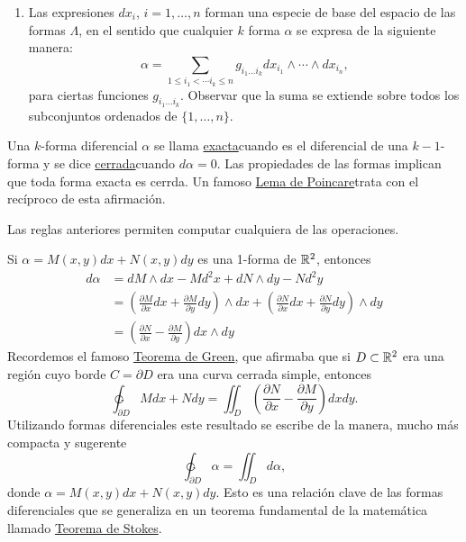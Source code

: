 \begin{subappendices}
\begin{enumerate}
\begin{enumerate}
  \end{enumerate}
  \item Las expresiones $dx_i$, $i=1,\ldots,n$ forman una especie de base del espacio de las formas $\Lambda$, en el sentido que cualquier $k$ forma $\alpha$ se expresa de la siguiente manera:
  \[\alpha=\sum_{1\leq i_1<\cdots i_k\leq n}g_{i_1\ldots i_k} dx_{i_1}\wedge\cdots\wedge dx_{i_n},\]
  para ciertas funciones $g_{i_1\ldots i_k}$. Observar que la suma se extiende sobre todos los subconjuntos ordenados de $\{1,\ldots,n\}$.
\end{enumerate}


Una $k$-forma diferencial $\alpha$ se llama \href{https://es.wikipedia.org/wiki/Formas_diferenciales_cerradas_y_exactas}{exacta}\link cuando es el diferencial de una $k-1$-forma y se dice \href{https://es.wikipedia.org/wiki/Formas_diferenciales_cerradas_y_exactas}{cerrada}\link cuando $d\alpha=0$. Las propiedades de las formas implican que toda forma exacta es cerrda. Un famoso \href{https://es.wikipedia.org/wiki/Formas_diferenciales_cerradas_y_exactas#Lema_de_Poincar.C3.A9}{Lema de Poincare}\link trata con el recíproco de esta afirmación.

Las reglas anteriores permiten computar cualquiera de las operaciones.
\begin{ejemplo} Si $\alpha=M(x,y)dx+N(x,y)dy$ es una 1-forma de $\mathbb{R}^2$, entonces
\[ \begin{split}
    d\alpha&=dM\wedge dx-Md^2x + dN\wedge dy-Nd^2y\\
    &=\left(\frac{\partial M}{\partial x}dx+ \frac{\partial M}{\partial y}dy\right)\wedge dx+
    \left(\frac{\partial N}{\partial x}dx+ \frac{\partial N}{\partial y}dy\right)\wedge dy\\
    &= \left(\frac{\partial N}{\partial x}- \frac{\partial M}{\partial y}\right) dx\wedge dy
   \end{split}
\]
Recordemos el famoso \href{https://es.wikipedia.org/wiki/Teorema_de_Green}{Teorema de Green}\link, que afirmaba que si $D\subset \mathbb{R}^2$ era una región cuyo borde $C=\partial D$ era una curva cerrada simple, entonces
\[\ointctrclockwise_{\partial D} Mdx +Ndy=\iint_D \left(\frac{\partial N}{\partial x}- \frac{\partial M}{\partial y}\right) dx dy.\]
Utilizando formas diferenciales este resultado se escribe de la manera, mucho más compacta y sugerente
\[\ointctrclockwise_{\partial D} \alpha = \iint_Dd\alpha,\]
donde $\alpha =M(x,y)dx+N(x,y)dy$.  Esto es una relación clave de las formas diferenciales que se generaliza en un teorema fundamental de la matemática llamado \href{https://es.wikipedia.org/wiki/Teorema_de_Stokes}{Teorema de Stokes}\link.
\end{ejemplo}





\end{subappendices}
